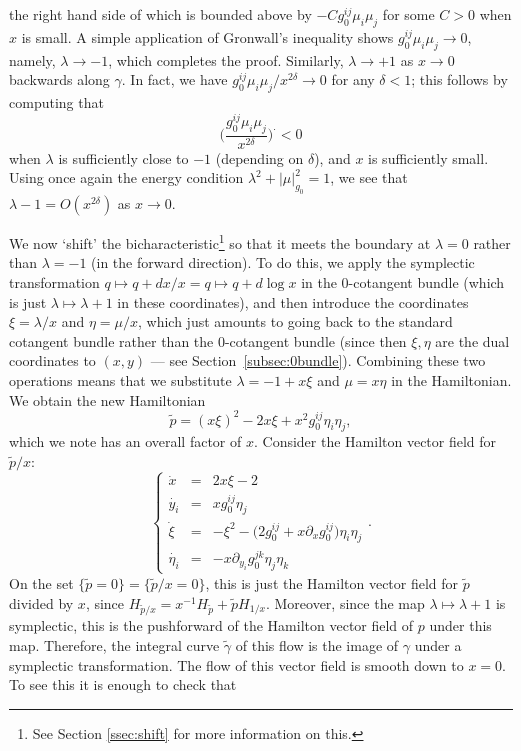 \documentclass[10pt, a4paper, twoside]{amsart}
\numberwithin{equation}{section}
\theoremstyle{remark}
\begin{document}
the right hand side of which is bounded above by $- C g_0^{ij} \mu_i \mu_j$ for some $C > 0$ when $x$ is small. A simple application of Gronwall's inequality shows $g_0^{ij} \mu_i \mu_j \rightarrow 0$, namely, $\lambda \rightarrow - 1$, which completes the proof. Similarly, $\lambda \to +1$ as $x \to 0$ backwards along $\gamma$. In fact, we have $g_0^{ij} \mu_i \mu_j / x^{2\delta} \to 0$ for any $\delta < 1$; this follows by computing that
$$
\Big( \frac{g_0^{ij} \mu_i \mu_j}{x^{2\delta}} \Big)^\cdot < 0
$$
when $\lambda$ is sufficiently close to $-1$ (depending on $\delta$), and $x$ is sufficiently small. Using once again the energy condition $\lambda^2 + |\mu|_{g_0}^2 = 1$, we see that $\lambda - 1 = O(x^{2\delta})$ as $x \to 0$.

We now `shift' the bicharacteristic\footnote{See Section \ref{ssec:shift} for more information on this.} so that it meets the boundary at $\lambda = 0$ rather than $\lambda = -1$ (in the forward direction). To do this, we apply the symplectic transformation $q \mapsto q + dx/x = q \mapsto q + d\log x$ in the $0$-cotangent bundle (which is just $\lambda \mapsto \lambda + 1$ in these coordinates), and then introduce the coordinates $\xi = \lambda/x$ and $\eta = \mu/x$, which just amounts to going back to the standard cotangent bundle rather than the $0$-cotangent bundle (since then $\xi, \eta$ are the dual coordinates to $(x, y)$ --- see Section~\ref{subsec:0bundle}).  Combining these two operations means that we substitute $\lambda = -1 + x\xi$ and $\mu = x \eta$ in the Hamiltonian. We obtain the new Hamiltonian
$$
\tilde p = (x \xi)^2 - 2 x \xi + x^2 g_0^{ij} \eta_i \eta_j,
$$
which we note has an overall factor of $x$. Consider the Hamilton vector field for $\tilde p/x$:
\begin{equation}
\left\{ \begin{array}{ccl}
\dot{x} &=& 2 x \xi - 2  \\
\dot{y_i} & = &  x g_0^{ij} \eta_j  \\
\dot{\xi} & = & - \xi^2 - \Big(2g_0^{ij} +x \partial_x g_0^{ij}  \Big) \eta_i \eta_j     \\
\dot{\eta_i} & = &  - x \partial_{y_i}  g_0^{jk} \eta_j \eta_k  \end{array} \right..
\label{shvf}\end{equation}
On the set $\{ \tilde p = 0 \} = \{ \tilde p/x = 0 \}$, this is just the Hamilton vector field for $\tilde p$ divided by $x$, since $H_{\tilde p/x} = x^{-1} H_{\tilde p} + \tilde p H_{1/x}$. Moreover, since the map $\lambda \mapsto \lambda + 1$ is symplectic, this is the pushforward of the Hamilton vector field of $p$ under this map. Therefore, the integral curve ${\tilde \gamma}$ of this flow is the image of $\gamma$ under a symplectic transformation.  The flow of this vector field is smooth down to $x=0$. To see this it is enough to check that
\end{document}
